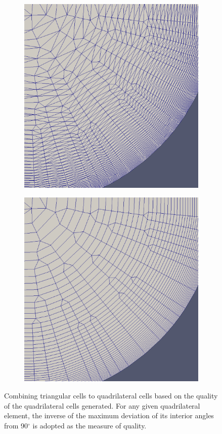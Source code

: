 \begin{figure}
\centering
\begin{subfigure}{0.5\textwidth}
\includegraphics[width=0.9\linewidth]{img/m2/combine-tris-to-quads/combineTrisToQuads1.eps}
\caption{}
\label{fig-triQuad1}
\end{subfigure}%
\begin{subfigure}{0.5\textwidth}
\includegraphics[width =0.9\linewidth]{img/m2/combine-tris-to-quads/combineTrisToQuads2.eps}
\caption{}
\label{fig-triQuad2}
\end{subfigure}
\caption{Combining triangular cells to quadrilateral cells based on the quality of the quadrilateral cells generated. For any given quadrilateral element, the inverse of the maximum deviation of its interior angles from 90$^\circ$ is adopted as the measure of quality.}
\label{fig-triQuad}
\end{figure}


